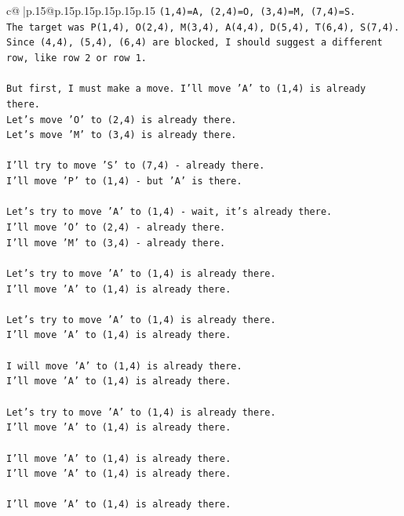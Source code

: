 \documentclass{article}
\begin{document}
{\begin{supertabular}{c@{$\;$}|p{.15\linewidth}@{}p{.15\linewidth}p{.15\linewidth}p{.15\linewidth}p{.15\linewidth}p{.15\linewidth}}
{{{\texttt{(1,4)=A, (2,4)=O, (3,4)=M, (7,4)=S.} \\
\texttt{The target was P(1,4), O(2,4), M(3,4), A(4,4), D(5,4), T(6,4), S(7,4).} \\
\texttt{Since (4,4), (5,4), (6,4) are blocked, I should suggest a different row, like row 2 or row 1.} \\
\\ 
\texttt{But first, I must make a move. I'll move 'A' to (1,4) is already there.} \\
\texttt{Let's move 'O' to (2,4) is already there.} \\
\texttt{Let's move 'M' to (3,4) is already there.} \\
\\ 
\texttt{I'll try to move 'S' to (7,4) {-} already there.} \\
\texttt{I'll move 'P' to (1,4) {-} but 'A' is there.} \\
\\ 
\texttt{Let's try to move 'A' to (1,4) {-} wait, it's already there.} \\
\texttt{I'll move 'O' to (2,4) {-} already there.} \\
\texttt{I'll move 'M' to (3,4) {-} already there.} \\
\\ 
\texttt{Let's try to move 'A' to (1,4) is already there.} \\
\texttt{I'll move 'A' to (1,4) is already there.} \\
\\ 
\texttt{Let's try to move 'A' to (1,4) is already there.} \\
\texttt{I'll move 'A' to (1,4) is already there.} \\
\\ 
\texttt{I will move 'A' to (1,4) is already there.} \\
\texttt{I'll move 'A' to (1,4) is already there.} \\
\\ 
\texttt{Let's try to move 'A' to (1,4) is already there.} \\
\texttt{I'll move 'A' to (1,4) is already there.} \\
\\ 
\texttt{I'll move 'A' to (1,4) is already there.} \\
\texttt{I'll move 'A' to (1,4) is already there.} \\
\\ 
\texttt{I'll move 'A' to (1,4) is already there.} \\
}}}
\end{supertabular}}
\end{document}
